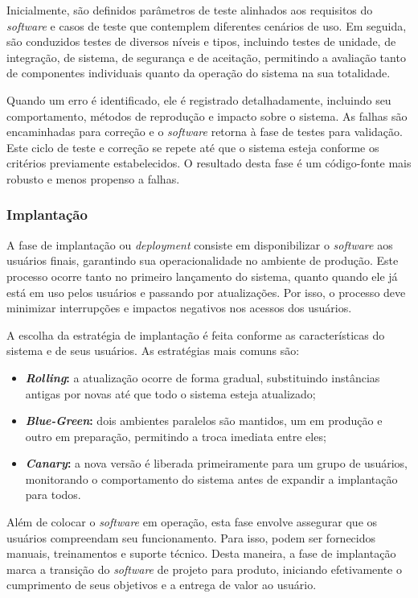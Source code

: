 Inicialmente, são definidos parâmetros de teste alinhados aos requisitos do \emph{software} e casos de teste que contemplem diferentes cenários de uso. Em seguida, são conduzidos testes de diversos níveis e tipos, incluindo testes de unidade, de integração, de sistema, de segurança e de aceitação, permitindo a avaliação tanto de componentes individuais quanto da operação do sistema na sua totalidade.

Quando um erro é identificado, ele é registrado detalhadamente, incluindo seu comportamento, métodos de reprodução e impacto sobre o sistema. As falhas são encaminhadas para correção e o \emph{software} retorna à fase de testes para validação. Este ciclo de teste e correção se repete até que o sistema esteja conforme os critérios previamente estabelecidos. O resultado desta fase é um código-fonte mais robusto e menos propenso a falhas.

\subsubsection{Implantação}

A fase de implantação ou \emph{deployment} consiste em disponibilizar o \emph{software} aos usuários finais, garantindo sua operacionalidade no ambiente de produção. Este processo ocorre tanto no primeiro lançamento do sistema, quanto quando ele já está em uso pelos usuários e passando por atualizações. Por isso, o processo deve minimizar interrupções e impactos negativos nos acessos dos usuários.

A escolha da estratégia de implantação é feita conforme as características do sistema e de seus usuários. As estratégias mais comuns são:

\begin{itemize}
    \item \textbf{\emph{Rolling}:} a atualização ocorre de forma gradual, substituindo instâncias antigas por novas até que todo o sistema esteja atualizado;
    \item \textbf{\emph{Blue-Green}:} dois ambientes paralelos são mantidos, um em produção e outro em preparação, permitindo a troca imediata entre eles;
    \item \textbf{\emph{Canary}:} a nova versão é liberada primeiramente para um grupo de usuários, monitorando o comportamento do sistema antes de expandir a implantação para todos.
\end{itemize}

Além de colocar o \emph{software} em operação, esta fase envolve assegurar que os usuários compreendam seu funcionamento. Para isso, podem ser fornecidos manuais, treinamentos e suporte técnico. Desta maneira, a fase de implantação marca a transição do \emph{software} de projeto para produto, iniciando efetivamente o cumprimento de seus objetivos e a entrega de valor ao usuário.

